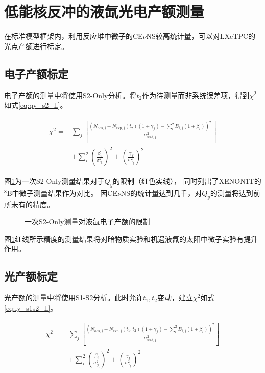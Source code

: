 \section{低能核反冲的液氙光电产额测量}

在标准模型框架内，利用反应堆中微子的CE$\nu$NS较高统计量，可以对LXeTPC的光点产额进行标定。

\subsection{电子产额标定}

电子产额的测量中将使用S2-Only分析。将$t_2$作为待测量而非系统误差项，得到$\chi^2$如式\ref{eq:qy_s2_ll}。

\begin{align}
    \label{eq:qy_s2_ll}
    \begin{split}
    \chi^2 =& \sum_j\left[\frac{\left(N_{\mathrm{obs},j} - N_{\mathrm{exp},j}(t_2)(1 + \gamma_f) 
    - \sum_{i}^2 B_{i,j}(1 + \beta_i)\right)^2}{\sigma^2_{\mathrm{stat},j}}\right] \\
    & + \sum_{i}^2(\frac{\beta_i}{\sigma^2_{\beta_i}})^2 + (\frac{\gamma_f}{\sigma^2_{\gamma_f}})^2
    \end{split}
\end{align}

图\ref{fig:qy_sensitivity_s2only}为一次S2-Only测量结果对于$Q_y$的限制（红色实线），
同时列出了XENON1T的${}^{8}\mathrm{B}$中微子测量结果作为对比\cite{aprile_search_2021}。
因CE$\nu$NS的统计量达到几千，对$Q_y$的测量将达到前所未有的精度。

\begin{figure}
  \centering
  
  \caption{\label{fig:qy_sensitivity_s2only} 一次S2-Only测量对液氙电子产额的限制}
\end{figure}

图\ref{fig:qy_sensitivity_s2only}红线所示精度的测量结果将对暗物质实验和机遇液氙的太阳中微子实验有提升作用。

\subsection{光产额标定}

光产额的测量中将使用S1-S2分析。此时允许$t_1,t_2$变动，建立$\chi^2$如式\ref{eq:ly_s1s2_ll}。

\begin{align}
    \label{eq:ly_s1s2_ll}
    \begin{split}
    \chi^2 =& \sum_j\left[\frac{\left(N_{\mathrm{obs},j} - N_{\mathrm{exp},j}(t_1,t_2)(1 + \gamma_f) 
    - \sum_{i}^2 B_{i,j}(1 + \beta_i)\right)^2}{\sigma^2_{\mathrm{stat},j}}\right] \\
    & + \sum_{i}^2(\frac{\beta_i}{\sigma^2_{\beta_i}})^2 + (\frac{\gamma_f}{\sigma^2_{\gamma_f}})^2
    \end{split}
\end{align}

